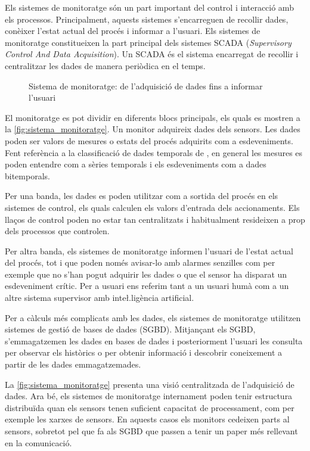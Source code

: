 Els sistemes de monitoratge són un part important del control i interacció amb els processos. Principalment, aquests sistemes s'encarreguen de recollir dades, conèixer l'estat actual del procés i informar a l'usuari. Els sistemes de monitoratge constitueixen la part principal dels sistemes SCADA (\emph{Supervisory Control And Data Acquisition}). Un SCADA  és el sistema encarregat de recollir i centralitzar les dades de manera periòdica en el temps.



\begin{figure}[tp]
  \begin{center}
    \scriptsize 
    
  \end{center}
  \caption{Sistema de monitoratge: de l'adquisició de dades fins a informar l'usuari}
  \label{fig:sistema_monitoratge}
\end{figure}


El monitoratge es pot dividir en diferents blocs principals, els quals es mostren a la \autoref{fig:sistema_monitoratge}. Un monitor adquireix dades dels sensors. Les dades poden ser valors de mesures o estats del procés adquirits com a esdeveniments. Fent referència a la classificació de dades temporals de \textcite{assfalg08:thesis}, en general les mesures es poden entendre com a sèries temporals i els esdeveniments com a dades bitemporals.

Per una banda, les dades es poden utilitzar com a sortida del procés en els sistemes de control, els quals calculen els valors d'entrada dels accionaments.
Els llaços de control poden no estar tan centralitzats i habitualment resideixen a prop dels processos que controlen.

Per altra banda, els sistemes de monitoratge informen l'usuari de l'estat actual del procés, tot i que poden només avisar-lo amb alarmes senzilles com per exemple que no s'han pogut adquirir les dades o que el sensor ha disparat un esdeveniment crític. Per a usuari ens referim tant a un usuari humà com a un altre sistema supervisor amb inte\l.ligència artificial. 

Per a càlculs més complicats amb les dades, els sistemes de monitoratge utilitzen sistemes de gestió de bases de dades (SGBD). Mitjançant els SGBD, s'emmagatzemen les dades en bases de dades i posteriorment l'usuari les consulta per observar els històrics o per obtenir informació i descobrir coneixement a partir de les dades emmagatzemades. 

La \autoref{fig:sistema_monitoratge} presenta una visió centralitzada de l'adquisició de dades. Ara bé, els sistemes de monitoratge internament poden tenir estructura distribuïda quan els sensors tenen suficient capacitat de processament, com per exemple les xarxes de sensors. En aquests casos els monitors cedeixen parts al sensors, sobretot pel que fa als SGBD que passen a tenir un paper més rellevant en la comunicació.  







